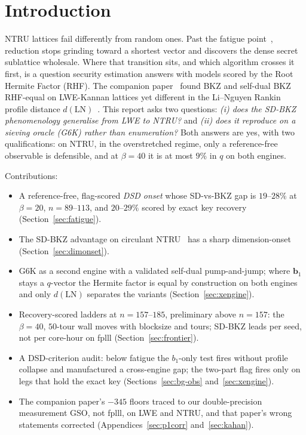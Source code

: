 \documentclass[journal=cic,version=preprint]{iacrj}
\begin{document}
\section{Introduction}
\label{sec:intro}

NTRU lattices fail differently from random ones. Past the fatigue
point~\cite{DucasWoerden2021}, reduction stops grinding toward a shortest
vector and discovers the dense secret sublattice wholesale. Where that
transition sits, and which algorithm crosses it first, is a question security
estimation answers with models scored by the Root Hermite Factor (RHF). The
companion paper~\cite{Paper1} found BKZ and self-dual
BKZ~\cite{EC:MicWal16} RHF-equal on LWE-Kannan lattices yet different in the
Li--Nguyen Rankin profile distance $d(\mathrm{LN})$~\cite{EPRINT:LiNgu20}. This report asks two
questions: \emph{(i) does the SD-BKZ phenomenology generalise from LWE to
NTRU?} and \emph{(ii) does it reproduce on a sieving oracle (G6K) rather than
enumeration?} Both answers are yes, with two qualifications: on NTRU, in the overstretched regime, only a reference-free observable is defensible, and at $\beta=40$ it is at
most $9\%$ in $q$ on both engines.

Contributions:
\begin{itemize}
  \item A reference-free, flag-scored \emph{DSD onset} whose SD-vs-BKZ gap is $19$--$28\%$ at $\beta=20$, $n=89$--$113$, and $20$--$29\%$ scored by exact key recovery (Section~\ref{sec:fatigue}).
  \item The SD-BKZ advantage on circulant NTRU~\cite{DucasWoerden2021} has a sharp dimension-onset (Section~\ref{sec:dimonset}).
  \item G6K as a second engine with a validated self-dual pump-and-jump; where $\mathbf b_1$ stays a $q$-vector the Hermite factor is equal by construction on both engines and only $d(\mathrm{LN})$ separates the variants (Section~\ref{sec:xengine}).
  \item Recovery-scored ladders at $n=157$--$185$, preliminary above $n=157$: the $\beta=40$, $50$-tour wall moves with blocksize and tours; SD-BKZ leads per seed, not per core-hour on fplll (Section~\ref{sec:frontier}).
  \item A DSD-criterion audit: below fatigue the $b_1$-only test fires without profile collapse and manufactured a cross-engine gap; the two-part flag fires only on legs that hold the exact key (Sections~\ref{sec:bg-obs} and~\ref{sec:xengine}).
  \item The companion paper's $-345$ floors traced to our double-precision measurement GSO, not fplll, on LWE and NTRU, and that paper's wrong statements corrected (Appendices~\ref{sec:p1corr} and~\ref{sec:kahan}).
\end{itemize}
\end{document}
